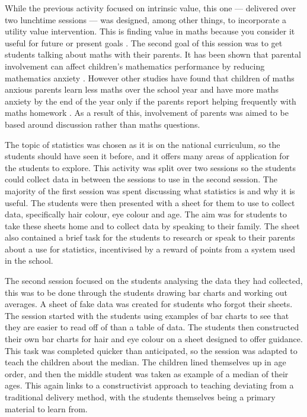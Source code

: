 \documentclass[11pt, a4paper, notitlepage]{article}
\begin{document}
While the previous activity focused on intrinsic value, this one --- delivered over two lunchtime sessions --- was designed, among other things, to incorporate a utility value intervention. This is finding value in maths because you consider it useful for future or present goals \cite{MAES:2024}. The second goal of this session was to get students talking about maths with their parents. It has been shown that parental involvement can affect children's mathematics performance by reducing mathematics anxiety \cite{Vukovic01052013}. However other studies have found that children of maths anxious parents learn less maths over the school year and have more maths anxiety by the end of the year only if the parents report helping frequently with maths homework \cite{Maloney:2015}. As a result of this, involvement of parents was aimed to be based around discussion rather than maths questions.
\par
The topic of statistics was chosen as it is on the national curriculum, so the students should have seen it before, and it offers many areas of application for the students to explore. This activity was split over two sessions so the students could collect data in between the sessions to use in the second session. The majority of the first session was spent discussing what statistics is and why it is useful. The students were then presented with a sheet for them to use to collect data, specifically hair colour, eye colour and age. 
The aim was for students to take these sheets home and to collect data by speaking to their family. The sheet also contained a brief task for the students to research or speak to their parents about a use for statistics, incentivised by a reward of points from a system used in the school.
\par
\vspace{1em}
The second session focused on the students analysing the data they had collected, this was to be done through the students drawing bar charts and working out averages. A sheet of fake data was created for students who forgot their sheets. The session started with the students using examples of bar charts to see that they are easier to read off of than a table of data. The students then constructed their own bar charts for hair and eye colour on a sheet designed to offer guidance. This task was completed quicker than anticipated, so the session was adapted to teach the children about the median. The children lined themselves up in age order, and then the middle student was taken as example of a median of their ages. This again links to a constructivist approach to teaching deviating from a traditional delivery method, with the students themselves being a primary material to learn from.
\end{document}
